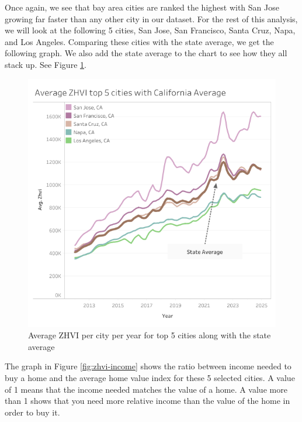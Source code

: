 \documentclass[journal]{IEEEtran}
\begin{document}
Once again, we see that bay area cities are ranked the highest with San Jose
growing far faster than any other city in our dataset. For the rest of this
analysis, we will look at the following 5 cities, San Jose, San Francisco,
Santa Cruz, Napa, and Los Angeles. Comparing these cities with the state
average, we get the following graph. We also add the state average to the chart
to see how they all stack up. See Figure \ref{fig:zhvi-year-top}.

\begin{figure}
	\centering
	\includegraphics[width=1\linewidth]{zhvi-year-top5.png}
	\caption{Average ZHVI per city per year for top 5 cities along with the state average}
	\label{fig:zhvi-year-top}
\end{figure}

The graph in Figure \ref{fig:zhvi-income} shows the ratio between income needed
to buy a home and the average home value index for these 5 selected cities. A
value of 1 means that the income needed matches the value of a home. A value
more than 1 shows that you need more relative income than the value of the home
in order to buy it.
\end{document}
